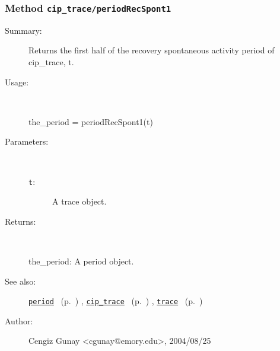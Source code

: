 \subsubsection[Method \texttt{periodRecSpont1}]{Method \texttt{cip\_trace/periodRecSpont1}}%
%
\label{ref_cip_trace__periodRecSpont1}%
\hypertarget{ref_cip_trace__periodRecSpont1}{}%
\begin{description}
\item[Summary:]Returns the first half of the recovery spontaneous
		 activity period of cip\_trace, t. 
%
\item[Usage:]~%
\begin{lyxcode}%
the\_period = periodRecSpont1(t)
%
\end{lyxcode}%
%
%
\item[Parameters:]~
\begin{description}%
\item[\texttt{t}:]
 A trace object.
\end{description}%
%
\item[Returns:
]~

	the\_period: A period object.
%
%
\item[See also:]%
\hyperlink{ref_period}{\texttt{period}}%
\ (p.~\pageref{ref_period})%
%
, \hyperlink{ref_cip_trace}{\texttt{cip\_trace}}%
\ (p.~\pageref{ref_cip_trace})%
%
, \hyperlink{ref_trace}{\texttt{trace}}%
\ (p.~\pageref{ref_trace})%
%
%
\item[Author:]%
Cengiz Gunay <cgunay@emory.edu>, 2004/08/25
%
\end{description}
\methodline%
